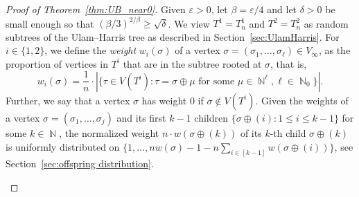 \documentclass[11pt]{article}
\numberwithin{equation}{section}
\DeclareMathOperator{\N}{\mathbb{N}} %
\newcommand{\eps}{\varepsilon} %
\theoremstyle{definition}
\begin{document}
\begin{proof}[Proof of Theorem~\ref{thm:UB_near0}]
    Given $\eps>0$, let $\beta = \eps/4$ and let $\delta>0$ be small enough so that $(\beta/3)^{2/\beta} \geq \sqrt{\delta}$.
    We view $T^1=T^1_n$ and $T^2=T^2_n$ as random subtrees of the Ulam--Harris tree as described in Section~\ref{sec:UlamHarris}. For $i \in \{1,2\}$, we define the {\sl weight} $w_i(\sigma)$ of a vertex $\sigma=(\sigma_1, \ldots, \sigma_\ell)\in V_\infty$, as the proportion of vertices in $T^i$ that are in the subtree rooted at $\sigma$, that is,
    \begin{equation*}
        w_i(\sigma)= \frac{1}{n}\cdot |\{ \tau \in V(T^i) \colon \tau = \sigma\oplus \mu \text{ for some } \mu \in \N^\ell, \ell \in \N_0\}| .
    \end{equation*}
    Further, we say that a vertex $\sigma$ has weight $0$ if $\sigma \notin V(T^i)$.  Given the weights of a vertex $\sigma=(\sigma_1,\ldots,\sigma_j)$ and its first $k-1$ children $\{\sigma\oplus (i):1\leq i \leq k-1\}$ for some $k \in \N$, the normalized weight $n\cdot w(\sigma \oplus (k))$ of its $k$-th child $\sigma \oplus (k)$ is uniformly distributed on $\{1,\ldots,nw(\sigma)-1-n\sum_{i \in [k-1]}w(\sigma\oplus (i))\}$, see Section~\ref{sec:offspring distribution}.

\begin{figure}[h]
\centering
{}
\end{figure}
\end{proof}
\end{document}

